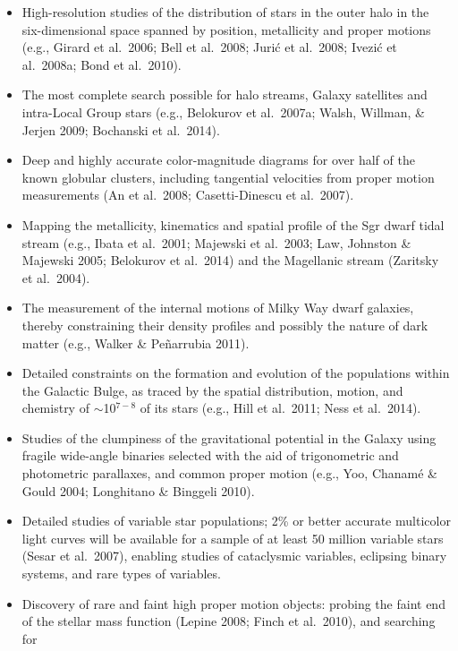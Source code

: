 \begin{itemize}
\item High-resolution studies of the distribution of stars in the outer halo
          in the six-dimensional space spanned by position, metallicity and proper
          motions (e.g., Girard et al.~2006; Bell et al.~2008; Juri\'{c} et al.~2008;
          Ivezi\'{c} et al.~2008a; Bond et al.~2010).
\item The most complete search possible for halo streams, Galaxy satellites and intra-Local Group
          stars (e.g., Belokurov et al.~2007a; Walsh, Willman, \& Jerjen 2009; Bochanski et al.~2014).
\item Deep and highly accurate color-magnitude diagrams for over half of the known
          globular clusters, including tangential velocities from proper motion
          measurements (An et al.~2008; Casetti-Dinescu et al.~2007).
\item Mapping the metallicity, kinematics and spatial profile of the Sgr dwarf tidal
          stream (e.g., Ibata et al.~2001; Majewski et al.~2003; Law, Johnston \& Majewski 2005; Belokurov et al.~2014)
          and the Magellanic stream (Zaritsky et al.~2004).
\item The measurement of the internal motions of Milky Way dwarf
          galaxies, thereby constraining their density profiles and
	  possibly the nature of dark matter (e.g., Walker \&
	  Pe{\~n}arrubia 2011).
\item Detailed constraints on the formation and evolution of the populations within the Galactic Bulge, as traced by the spatial
          distribution, motion, and chemistry of $\sim$10$^{7-8}$ of its stars (e.g., Hill et al.~2011; Ness et al.~2014).
\item Studies of the clumpiness of the gravitational potential in the Galaxy using
          fragile wide-angle binaries selected with the aid of trigonometric and
          photometric parallaxes, and common proper motion (e.g., Yoo, Chanam\'{e} \& Gould 2004; Longhitano \& Binggeli 2010).
\item Detailed studies of variable star populations; 2\% or better accurate
          multicolor light curves will be available for a sample of at least 50
          million variable stars (Sesar et al.~2007), enabling studies of
          cataclysmic variables, eclipsing binary systems, and rare types of variables.
\item Discovery of rare and faint high proper motion objects: probing the
          faint end of the stellar mass function (Lepine 2008; Finch et al.~2010), and searching for

\end{itemize}
